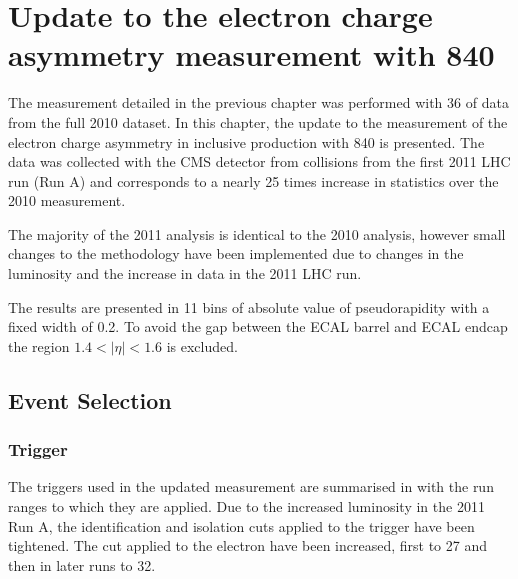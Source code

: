 \chapter[Electron Charge Asymmetry]{Update to the electron charge asymmetry
measurement with \unit{840}{\invpb} }
\label{chap:update}

The measurement detailed in the previous chapter was performed with
\unit{36}{\invpb} of data from the full 2010 dataset. 
In this chapter, the update to the measurement of the electron charge asymmetry in
inclusive \inclusiveWe production with \unit{840}{\invpb} is presented. 
The data was collected with the {CMS} detector from collisions from the
first 2011 {LHC} run (Run A) and corresponds to a nearly 25 times increase in
statistics over the 2010 measurement.

The majority of the 2011 analysis is identical to the 2010 analysis,
however small changes to the methodology have been implemented due to changes
in the luminosity and the increase in data in the 2011 {LHC} run.

The results are presented in 11 bins of absolute value of pseudorapidity with a
fixed width of 0.2. To avoid the gap between the ECAL barrel and ECAL endcap the
region $1.4<|\eta|<1.6$ is excluded.

\section{Event Selection}

\subsection{Trigger}

The triggers used in the updated measurement are summarised in
 with the run ranges to which they are applied.
Due to the increased luminosity in the 2011 Run A, the identification and
isolation cuts applied to the trigger have been tightened. The \PT cut applied
to the electron have been increased, first to \unit{27}{\GeV} and then in later
runs to \unit{32}{\GeV}. 


